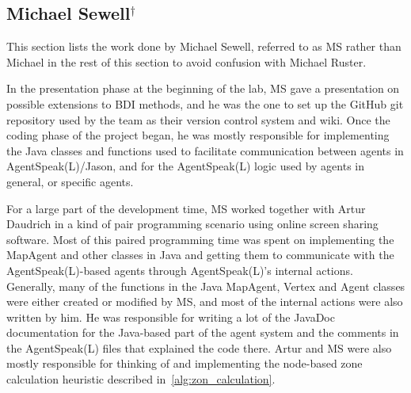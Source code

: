 \subsection[Michael Sewell]{Michael Sewell$^{\dagger}$}
This section lists the work done by Michael Sewell, referred to as MS rather than Michael in the rest of this section to avoid confusion with Michael Ruster.

In the presentation phase at the beginning of the lab, MS gave a presentation on possible extensions to BDI methods, and he was the one to set up the GitHub git repository used by the team as their version control system and wiki.
Once the coding phase of the project began, he was mostly responsible for implementing the Java classes and functions used to facilitate communication between agents in AgentSpeak(L)/Jason, and for the AgentSpeak(L) logic used by agents in general, or specific agents.

For a large part of the development time, MS worked together with Artur Daudrich in a kind of pair programming scenario using online screen sharing software.
Most of this paired programming time was spent on implementing the MapAgent and other classes in Java and getting them to communicate with the AgentSpeak(L)-based agents through AgentSpeak(L)'s internal actions.
Generally, many of the functions in the Java MapAgent, Vertex and Agent classes were either created or modified by MS, and most of the internal actions were also written by him.
He was responsible for writing a lot of the JavaDoc documentation for the Java-based part of the agent system and the comments in the AgentSpeak(L) files that explained the code there.
Artur and MS were also mostly responsible for thinking of and implementing the node-based zone calculation heuristic described in~\autoref{alg:zon_calculation}.

